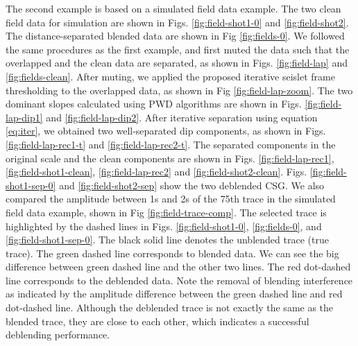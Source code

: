 


The second example is based on a simulated field data example. The two clean field data for simulation are shown in Figs. \ref{fig:field-shot1-0} and \ref{fig:field-shot2}. The distance-separated blended data are shown in Fig \ref{fig:fields-0}. We followed the same procedures as the first example, and first muted the data such that the overlapped and the clean data are separated, as shown in Figs. \ref{fig:field-lap} and \ref{fig:fields-clean}. After muting, we applied the proposed iterative seislet frame thresholding to the overlapped data, as shown in Fig \ref{fig:field-lap-zoom}. The two dominant slopes calculated using PWD algorithms are shown in Figs. \ref{fig:field-lap-dip1} and \ref{fig:field-lap-dip2}.  After iterative separation using equation \ref{eq:iter}, we obtained two well-separated dip components, as shown in Figs. \ref{fig:field-lap-rec1-t} and \ref{fig:field-lap-rec2-t}. The separated components in the original scale and the clean components are shown in Figs. \ref{fig:field-lap-rec1}, \ref{fig:field-shot1-clean}, \ref{fig:field-lap-rec2} and \ref{fig:field-shot2-clean}.  Figs. \ref{fig:field-shot1-sep-0} and \ref{fig:field-shot2-sep} show the two deblended CSG. We also compared the amplitude between 1s and 2s of the 75th trace in the simulated field data example, shown in Fig \ref{fig:field-trace-comp}. The selected trace is highlighted by the dashed lines in Figs. \ref{fig:field-shot1-0}, \ref{fig:fields-0}, and \ref{fig:field-shot1-sep-0}. The black solid line denotes the unblended trace (true trace). The green dashed line corresponds to blended data. We can see the big difference between green dashed line and the other two lines. The red dot-dashed line corresponds to the deblended data. Note the removal of blending interference as indicated by the amplitude difference between the green dashed line and red dot-dashed line. Although the deblended trace is not exactly the same as the blended trace, they are close to each other, which indicates a successful deblending performance.

